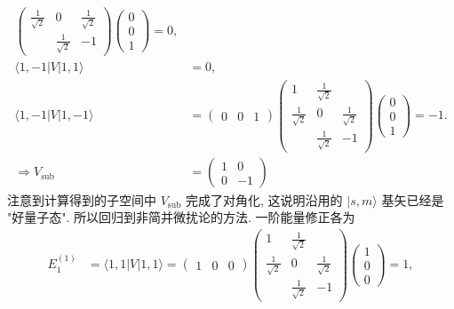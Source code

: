 \documentclass[../../main.tex]{subfiles}
\begin{document}
\begin{enumerate}
\begin{enumerate}
{{\begin{align*}
\begin{pmatrix}
        \frac{1}{\sqrt{2}} & 0  & \frac{1}{\sqrt{2}}\\
          & \frac{1}{\sqrt{2}} & -1
       \end{pmatrix}\begin{pmatrix}
          0\\
          0\\
          1
        \end{pmatrix} = 0,\\
        \langle 1,-1|V|1,1\rangle &= 0,\\
        \langle 1,-1|V|1,-1\rangle &= \begin{pmatrix}
          0 & 0 & 1
        \end{pmatrix}\begin{pmatrix}
          1 & \frac{1}{\sqrt{2}}& \\
          \frac{1}{\sqrt{2}} & 0  & \frac{1}{\sqrt{2}}\\
            & \frac{1}{\sqrt{2}} & -1
         \end{pmatrix}\begin{pmatrix}
            0\\
            0\\
            1
         \end{pmatrix} = -1.\\
         \Rightarrow V_{\text{sub}} &= \begin{pmatrix}
          1 & 0\\
          0 & -1
         \end{pmatrix}
    \end{align*}
    注意到计算得到的子空间中 $V_{\text{sub}}$ 完成了对角化, 这说明沿用的 $|s,m\rangle$ 基矢已经是 "好量子态". 所以回归到非简并微扰论的方法. 一阶能量修正各为
    \begin{align*}
      E_{1}^{(1)} &= \langle 1,1|V|1,1\rangle = \begin{pmatrix}
        1 & 0 & 0
      \end{pmatrix}\begin{pmatrix}
        1 & \frac{1}{\sqrt{2}}& \\
        \frac{1}{\sqrt{2}} & 0  & \frac{1}{\sqrt{2}}\\
          & \frac{1}{\sqrt{2}} & -1
       \end{pmatrix}\begin{pmatrix}
          1\\
          0\\
          0
       \end{pmatrix} = \boxed{1},\\

\end{align*}}}
\end{enumerate}
\end{enumerate}
\end{document}
